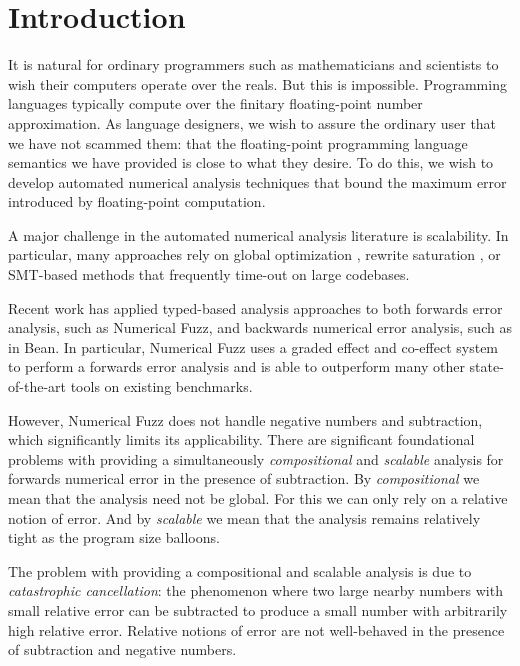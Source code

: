 \section{Introduction}

It is natural for ordinary programmers such as mathematicians and scientists to
wish their computers operate over the reals. But this is impossible. 
Programming languages typically compute over the finitary floating-point number
approximation.
As language designers, we wish to assure the ordinary user that we have not
scammed them: that the floating-point programming language semantics we have
provided is close to what they desire. 
To do this, we wish to develop automated numerical analysis techniques that
bound the maximum error introduced by floating-point computation.


A major challenge in the automated numerical analysis literature is scalability.
In particular, many approaches rely on global optimization \cite{fptaylor}
\cite{satire}, 
rewrite saturation \cite{gappa},
or SMT-based methods %
that frequently time-out on large codebases. 

Recent work has applied typed-based analysis approaches to both forwards error
analysis, such as Numerical Fuzz, and backwards numerical error analysis, such
as in Bean. \cite{numfuzz} \cite{bean}
In particular, Numerical Fuzz uses a graded effect and co-effect system to
perform a forwards error analysis and is able to outperform many other
state-of-the-art tools on existing benchmarks.

However, Numerical Fuzz does not handle negative numbers and subtraction, which
significantly limits its applicability. There are significant foundational
problems with providing a simultaneously \textit{compositional} and
\textit{scalable} analysis for forwards numerical error in the presence of
subtraction. By \textit{compositional} we mean that the analysis need not be
global. For this we can only rely on a relative notion of error. And by
\textit{scalable} we mean that the analysis remains relatively tight as the
program size balloons.

The problem with providing a compositional and scalable analysis is due to
\textit{catastrophic cancellation}: the phenomenon where two large nearby
numbers with small relative error can be subtracted to produce a small number
with arbitrarily high relative error. Relative notions of error are not
well-behaved in the presence of subtraction and negative numbers. 

